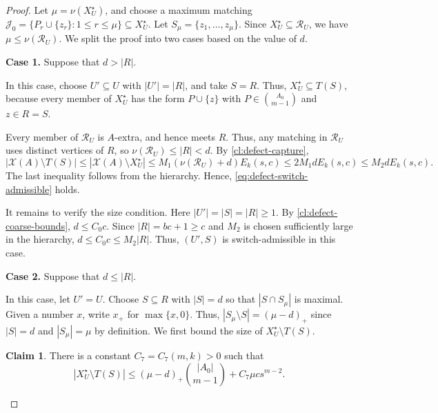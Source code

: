 \documentclass[10pt,a4paper]{article}
\numberwithin{equation}{section}
\theoremstyle{definition}
\newtheorem{claim}[claim]{Claim}
\newcommand{\X}{\mathcal X}
\newcommand{\Rcal}{\mathcal R}
\begin{document}
\begin{proof}
        Let $\mu=\nu(X_U^\star)$, and choose a maximum matching $\mathcal J_0
                =
                \{P_r\cup\{z_r\}:1\le r\le\mu\}
                \subseteq X_U^\star$.
        Let $S_\mu=\{z_1,\ldots,z_\mu\}$.
        Since $X_U^\star\subseteq\Rcal_U$, we have
        $\mu\le\nu(\Rcal_U)$.
        We split the proof into two cases based on the value of $d$.

        \medskip
        \noindent\textbf{Case 1.} Suppose that $d>|R|$.
        \medskip

        In this case, choose $U'\subseteq U$ with $|U'|=|R|$, and take $S=R$.
        Thus, $X_U^\star\subseteq T(S)$, because every member of
        $X_U^\star$ has the form $P\cup\{z\}$ with
        $P\in\binom{A_0}{m-1}$ and $z\in R=S$.

        Every member of $\Rcal_U$ is $A$-extra, and hence meets $R$.
        Thus, any matching in $\Rcal_U$ uses distinct vertices of $R$,
        so $\nu(\Rcal_U)\le |R|<d$.
        By \cref{cl:defect-capture},
        \[
                |\X(A)\setminus T(S)|
                \le
                |\X(A)\setminus X_U^\star|
                \le
                M_1(\nu(\Rcal_U)+d)E_k(s,c)
                \le
                2M_1dE_k(s,c)\le M_2dE_k(s,c).
        \]
        The last inequality follows from the hierarchy.  Hence,
        \eqref{eq:defect-switch-admissible} holds.

        It remains to verify the size condition.
        Here $|U'|=|S|=|R|\ge1$.
        By \cref{cl:defect-coarse-bounds}, $d\le C_0c$.
        Since $|R|=bc+1\ge c$ and $M_2$ is chosen sufficiently large
        in the hierarchy, $d\le C_0c\le M_2|R|$.
        Thus, $(U',S)$ is switch-admissible in this case.

        \medskip
        \noindent\textbf{Case 2.} Suppose that $d\le |R|$.
        \medskip

        In this case, let $U'=U$.
        Choose $S\subseteq R$ with $|S|=d$ so that $|S\cap S_\mu|$ is
        maximal.
        Given a number $x$, write $x_+$ for $\max\{x,0\}$.
        Thus, $|S_\mu\setminus S|=(\mu-d)_+$ since $|S|=d$ and $|S_\mu|=\mu$ by definition.
        We first bound the size of $X_U^\star\setminus T(S)$.
        \begin{claim}\label{cl:clean-center-XU-loss}
                There is a constant $C_7=C_7(m,k)>0$ such that
                \[
                        |X_U^\star\setminus T(S)|
                        \le
                        (\mu-d)_+\binom{|A_0|}{m-1}
                        +C_7\mu cs^{m-2}.
                \]
        \end{claim}


\end{proof}
\end{document}
